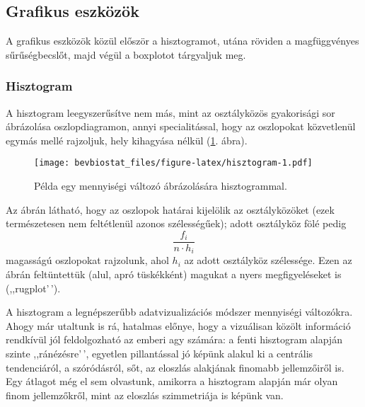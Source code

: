 \documentclass[
]{book}
\newenvironment{Shaded}{\begin{snugshade}}{\end{snugshade}}
\newcommand{\AttributeTok}[1]{\textcolor[rgb]{0.77,0.63,0.00}{#1}}
\newcommand{\FunctionTok}[1]{\textcolor[rgb]{0.00,0.00,0.00}{#1}}
\newcommand{\NormalTok}[1]{#1}
\newcommand{\SpecialCharTok}[1]{\textcolor[rgb]{0.00,0.00,0.00}{#1}}
\newcommand{\StringTok}[1]{\textcolor[rgb]{0.31,0.60,0.02}{#1}}
\begin{document}
\hypertarget{deskriptivmennyegyvaltgrafikus}{%
\subsection{Grafikus eszközök}\label{deskriptivmennyegyvaltgrafikus}}

A grafikus eszközök közül először a hisztogramot, utána röviden a magfüggvényes sűrűségbecslőt, majd végül a boxplotot tárgyaljuk meg.

\hypertarget{deskriptivmennyegyvaltgrafikushisztogram}{%
\subsubsection{Hisztogram}\label{deskriptivmennyegyvaltgrafikushisztogram}}

A hisztogram leegyszerűsítve nem más, mint az osztályközös gyakorisági sor ábrázolása oszlopdiagramon, annyi specialitással, hogy az oszlopokat közvetlenül egymás mellé rajzoljuk, hely kihagyása nélkül (\ref{fig:hisztogram}. ábra).

\begin{Shaded}
\end{Shaded}

\begin{figure}
\centering
\texttt{[image: bevbiostat\_files/figure-latex/hisztogram-1.pdf]}
\caption{\label{fig:hisztogram}Példa egy mennyiségi változó ábrázolására hisztogrammal.}
\end{figure}

Az ábrán látható, hogy az oszlopok határai kijelölik az osztályközöket (ezek természetesen nem feltétlenül azonos szélességűek); adott osztályköz fölé pedig
\[
    \frac{f_i}{n \cdot h_i}
\]
magasságú oszlopokat rajzolunk, ahol \(h_i\) az adott osztályköz szélessége. Ezen az ábrán feltüntettük (alul, apró tüskékként) magukat a nyers megfigyeléseket is (,,rugplot'\,').

A hisztogram a legnépszerűbb adatvizualizációs módszer mennyiségi változókra. Ahogy már utaltunk is rá, hatalmas előnye, hogy a vizuálisan közölt információ rendkívül jól feldolgozható az emberi agy számára: a fenti hisztogram alapján szinte ,,ránézésre'\,', egyetlen pillantással jó képünk alakul ki a centrális tendenciáról, a szóródásról, sőt, az eloszlás alakjának finomabb jellemzőiről is. Egy átlagot még el sem olvastunk, amikorra a hisztogram alapján már olyan finom jellemzőkről, mint az eloszlás szimmetriája is képünk van.
\end{document}
